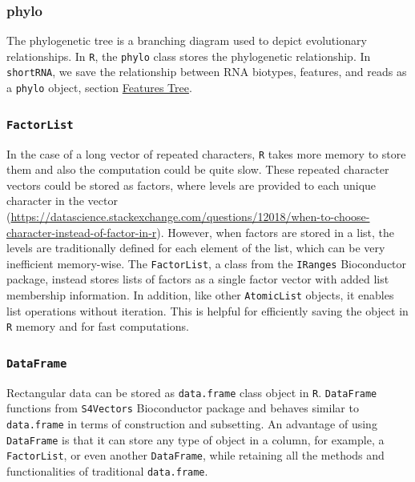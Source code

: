 \documentclass[12pt,twoside]{reedthesis}
\begin{document}
\hypertarget{phylo}{%
\subsubsection{phylo}\label{phylo}}

The phylogenetic tree is a branching diagram used to depict evolutionary
relationships. In \texttt{R}, the \texttt{phylo} class stores the phylogenetic
relationship. In \texttt{shortRNA}, we save the relationship between RNA
biotypes, features, and reads as a \texttt{phylo} object, section \protect\hyperlink{ft}{Features
Tree}.

\hypertarget{factorlist}{%
\subsubsection{\texorpdfstring{\texttt{FactorList}}{FactorList}}\label{factorlist}}

In the case of a long vector of repeated characters, \texttt{R} takes more
memory to store them and also the computation could be quite slow. These
repeated character vectors could be stored as factors, where levels are
provided to each unique character in the vector
(\url{https://datascience.stackexchange.com/questions/12018/when-to-choose-character-instead-of-factor-in-r}).
However, when factors are stored in a list, the levels are traditionally
defined for each element of the list, which can be very inefficient
memory-wise. The \texttt{FactorList}, a class from the \texttt{IRanges} Bioconductor
package, instead stores lists of factors as a single factor vector with
added list membership information. In addition, like other \texttt{AtomicList}
objects, it enables list operations without iteration. This is helpful
for efficiently saving the object in \texttt{R} memory and for fast
computations.

\hypertarget{dataframe}{%
\subsubsection{\texorpdfstring{\texttt{DataFrame}}{DataFrame}}\label{dataframe}}

Rectangular data can be stored as \texttt{data.frame} class object in \texttt{R}.
\texttt{DataFrame} functions from \texttt{S4Vectors} Bioconductor package and behaves
similar to \texttt{data.frame} in terms of construction and subsetting. An
advantage of using \texttt{DataFrame} is that it can store any type of object
in a column, for example, a \texttt{FactorList}, or even another \texttt{DataFrame},
while retaining all the methods and functionalities of traditional
\texttt{data.frame}.
\end{document}

